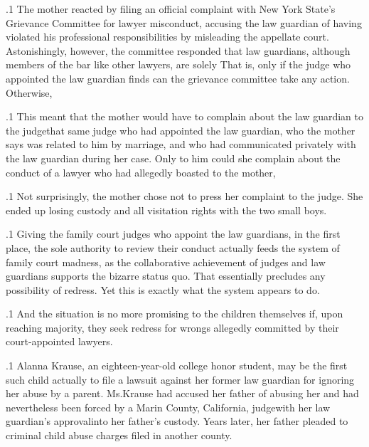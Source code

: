 \documentclass[11pt, twoside]{article}
\begin{document}
{\p.1{%
The mother reacted by filing an official complaint with New York
State’s Grievance Committee for lawyer misconduct, accusing the law
guardian of having violated his professional responsibilities by misleading the appellate court. Astonishingly, however, the committee
responded that law guardians, although members of the bar like other
lawyers, are solely 
That is, only if the judge who appointed the law guardian finds  can the grievance committee take
any action. Otherwise, 
}%

\p.1{%
This meant that the mother would have to complain about the law
guardian to the judge\mdash{}that same judge who had appointed the law
guardian, who the mother says was related to him by marriage, and
who had communicated privately with the law guardian during her case.
Only to him could she complain about the conduct of a lawyer who had
allegedly boasted to the mother, 
}%

\p.1{%
Not surprisingly, the mother chose not to press her complaint to the
judge. She ended up losing custody and all visitation rights with the two
small boys.
}%

\p.1{%
Giving the family court judges who appoint the law guardians, in the first place, the sole authority to review their conduct actually feeds the system of family court madness, as the collaborative achievement of judges and law
guardians supports the bizarre status quo. That essentially precludes any
possibility of redress. Yet this is exactly what the system appears to do.
}%

\p.1{%
And the situation is no more promising to the children themselves if,
upon reaching majority, they seek redress for wrongs allegedly committed by their court-appointed lawyers.
}%

\p.1{%
Alanna Krause, an eighteen-year-old college honor student, may be
the first such child actually to file a lawsuit against her former law guardian
for ignoring her abuse by a parent. Ms.\@ Krause had accused her father
of abusing her and had nevertheless been forced by a Marin County,
California, judge\mdash{}with her law guardian’s approval\mdash{}into her father’s
custody. Years later, her father pleaded  to criminal child
abuse charges filed in another county.
}%

}
\end{document}
